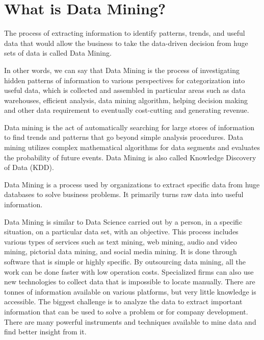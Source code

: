\documentclass[a4paper,10pt]{article}
\begin{document}
\section{What is Data Mining?}

The process of extracting information to identify patterns, trends, and useful data that would allow the business to take the data-driven decision from huge sets of data is called Data Mining.

In other words, we can say that Data Mining is the process of investigating hidden patterns of information to various perspectives for categorization into useful data, which is collected and assembled in particular areas such as data warehouses, efficient analysis, data mining algorithm, helping decision making and other data requirement to eventually cost-cutting and generating revenue.

Data mining is the act of automatically searching for large stores of information to find trends and patterns that go beyond simple analysis procedures. Data mining utilizes complex mathematical algorithms for data segments and evaluates the probability of future events. Data Mining is also called Knowledge Discovery of Data (KDD).

Data Mining is a process used by organizations to extract specific data from huge databases to solve business problems. It primarily turns raw data into useful information.

Data Mining is similar to Data Science carried out by a person, in a specific situation, on a particular data set, with an objective. This process includes various types of services such as text mining, web mining, audio and video mining, pictorial data mining, and social media mining. It is done through software that is simple or highly specific. By outsourcing data mining, all the work can be done faster with low operation costs. Specialized firms can also use new technologies to collect data that is impossible to locate manually. There are tonnes of information available on various platforms, but very little knowledge is accessible. The biggest challenge is to analyze the data to extract important information that can be used to solve a problem or for company development. There are many powerful instruments and techniques available to mine data and find better insight from it.
\end{document}
